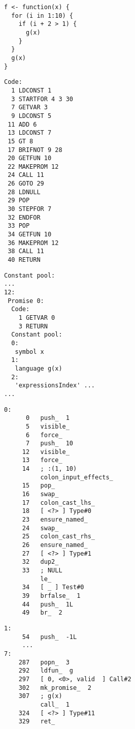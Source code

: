 \begin{listing}[p]
	\centering
	\begin{minipage}{0.33\textwidth}
		\begin{verbatim}
f <- function(x) {
  for (i in 1:10) {
    if (i + 2 > 1) {
      g(x)
    }
  }
  g(x)
}
    \end{verbatim}
		\label{lst:bc-example-r}
	\end{minipage}
	\hfill
	\begin{minipage}[t]{0.61\textwidth}
		\begin{minipage}{0.20\textwidth}
			\begin{verbatim}
Code:
  1 LDCONST 1
  3 STARTFOR 4 3 30
  7 GETVAR 3
  9 LDCONST 5
 11 ADD 6
 13 LDCONST 7
 15 GT 8
 17 BRIFNOT 9 28
 20 GETFUN 10
 22 MAKEPROM 12
 24 CALL 11
 26 GOTO 29
 28 LDNULL
 29 POP
 30 STEPFOR 7
 32 ENDFOR
 33 POP
 34 GETFUN 10
 36 MAKEPROM 12
 38 CALL 11
 40 RETURN
      \end{verbatim}
		\end{minipage}
		\hfill
		\begin{minipage}{0.40\textwidth}
			\begin{verbatim}
Constant pool:
...
12:
 Promise 0:
  Code:
    1 GETVAR 0
    3 RETURN
  Constant pool:
  0:
   symbol x
  1:
   language g(x)
  2:
   'expressionsIndex' ...
...
      \end{verbatim}
		\end{minipage}
		\label{lst:bc-example-gnur}
	\end{minipage}
	\par\vspace{2mm}\par
	\begin{minipage}{\textwidth}
		\centering
		\begin{minipage}{0.47\textwidth}
			\begin{verbatim}
0:
      0   push_  1
      5   visible_
      6   force_
      7   push_  10
     12   visible_
     13   force_
     14   ; :(1, 10)
          colon_input_effects_
     15   pop_
     16   swap_
     17   colon_cast_lhs_
     18   [ <?> ] Type#0
     23   ensure_named_
     24   swap_
     25   colon_cast_rhs_
     26   ensure_named_
     27   [ <?> ] Type#1
     32   dup2_
     33   ; NULL
          le_
     34   [ _ ] Test#0
     39   brfalse_  1
     44   push_  1L
     49   br_  2
      \end{verbatim}
		\end{minipage}
		\hfill
		\begin{minipage}{0.47\textwidth}
			\begin{verbatim}
1:
     54   push_  -1L
     ...
7:
    287   popn_  3
    292   ldfun_  g
    297   [ 0, <0>, valid  ] Call#2
    302   mk_promise_  2
    307   ; g(x)
          call_  1
    324   [ <?> ] Type#11
    329   ret_


\end{verbatim}
\end{minipage}
\end{minipage}
\end{listing}

